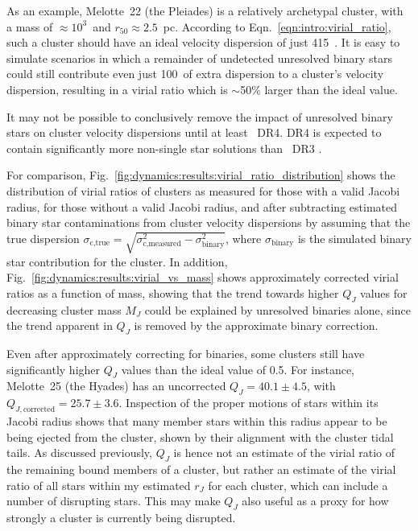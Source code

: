 As an example, Melotte~22 (the Pleiades) is a relatively archetypal cluster, with a mass of $\approx10^3$~\MSun and $r_{50}\approx 2.5$~pc. According to Eqn.~\ref{eqn:intro:virial_ratio}, such a cluster should have an ideal velocity dispersion of just 415~\ms. It is easy to simulate scenarios in which a remainder of undetected unresolved binary stars could still contribute even just 100~\ms of extra dispersion to a cluster's velocity dispersion, resulting in a virial ratio which is $\sim$50\% larger than the ideal value.

It may not be possible to conclusively remove the impact of unresolved binary stars on cluster velocity dispersions until at least \gaia\ DR4. DR4 is expected to contain significantly more non-single star solutions than \gaia\ DR3 \citep{gaia_collaboration_gaia_2022}.


For comparison, Fig.~\ref{fig:dynamics:results:virial_ratio_distribution} shows the distribution of virial ratios of clusters as measured for those with a valid Jacobi radius, for those without a valid Jacobi radius, and after subtracting estimated binary star contaminations from cluster velocity dispersions by assuming that the true dispersion $\sigma_\text{c,true}=\sqrt{\sigma_\text{c,measured}^2 - \sigma_\text{binary}^2}$, where $\sigma_\text{binary}$ is the simulated binary star contribution for the cluster. In addition, Fig.~\ref{fig:dynamics:results:virial_vs_mass} shows approximately corrected virial ratios as a function of mass, showing that the trend towards higher $Q_J$ values for decreasing cluster mass $M_J$ could be explained by unresolved binaries alone, since the trend apparent in $Q_J$ is removed by the approximate binary correction.

Even after approximately correcting for binaries, some clusters still have significantly higher $Q_J$ values than the ideal value of 0.5. For instance, Melotte~25 (the Hyades) has an uncorrected $Q_J=40.1\pm4.5$, with $Q_{J,\text{corrected}}=25.7\pm3.6$. Inspection of the proper motions of stars within its Jacobi radius shows that many member stars within this radius appear to be being ejected from the cluster, shown by their alignment with the cluster tidal tails. As discussed previously, $Q_J$ is hence not an estimate of the virial ratio of the remaining bound members of a cluster, but rather an estimate of the virial ratio of all stars within my estimated $r_J$ for each cluster, which can include a number of disrupting stars. This may make $Q_J$ also useful as a proxy for how strongly a cluster is currently being disrupted.   


